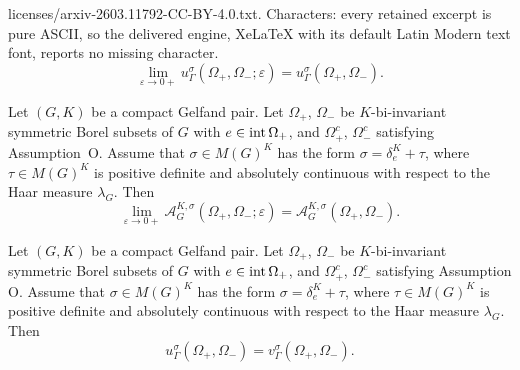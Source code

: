 \documentclass[10pt,a4paper]{amsart}
\newcommand{\intt}{\mbox{\rm int\,}}
\begin{document}
licenses/arxiv-2603.11792-CC-BY-4.0.txt. Characters: every retained excerpt is pure ASCII, so the delivered engine, XeLaTeX with its default Latin Modern text font, reports no missing character.
\begin{equation} \label{eq:C_correctly_posed}
\lim_{\varepsilon \to 0+} u_\Gamma^{\sigma}(\Omega_+, \Omega_-;\varepsilon) = u_\Gamma^{\sigma}(\Omega_+, \Omega_-).
\end{equation}

\begin{lemma} \label{lemma:C_epsilon}

Let $(G,K)$ be a compact Gelfand pair. Let $\Omega_+$, $\Omega_-$ be $K$-bi-invariant symmetric Borel subsets of $G$ with $e \in \intt{\Omega_+}$, and  $\Omega_+^c$, $\Omega_-^c$ satisfying Assumption~O. 
Assume that $\sigma\in M(G)^K$ has the form $\sigma = \delta_e^K + \tau $, where \(\tau \in M(G)^K\) is positive definite and absolutely continuous with respect to the Haar measure $\lambda_G$.
Then
$$
\lim_{\varepsilon \to 0+} \mathcal{A}^{K,\sigma}_G(\Omega_+, \Omega_-;\varepsilon) = \mathcal{A}^{K,\sigma}_G(\Omega_+, \Omega_{-}).
$$

\end{lemma}

\begin{theorem}\label{main_theorem}

Let $(G,K)$ be a compact Gelfand pair. Let $\Omega_+$, $\Omega_-$ be $K$-bi-invariant symmetric Borel subsets of $G$ with $e \in \intt{\Omega_+}$, and $\Omega_+^c$, $\Omega_-^c$ satisfying Assumption O. Assume that $\sigma\in M(G)^K$ has the form $\sigma = \delta_e^K + \tau $, where \(\tau \in M(G)^K\) is positive definite and absolutely continuous with respect to the Haar measure $\lambda_G$. Then
$$
u_\Gamma^{\sigma}(\Omega_+, \Omega_-) = v_\Gamma^{\sigma}(\Omega_+, \Omega_-).
$$

\end{theorem}
\end{document}
